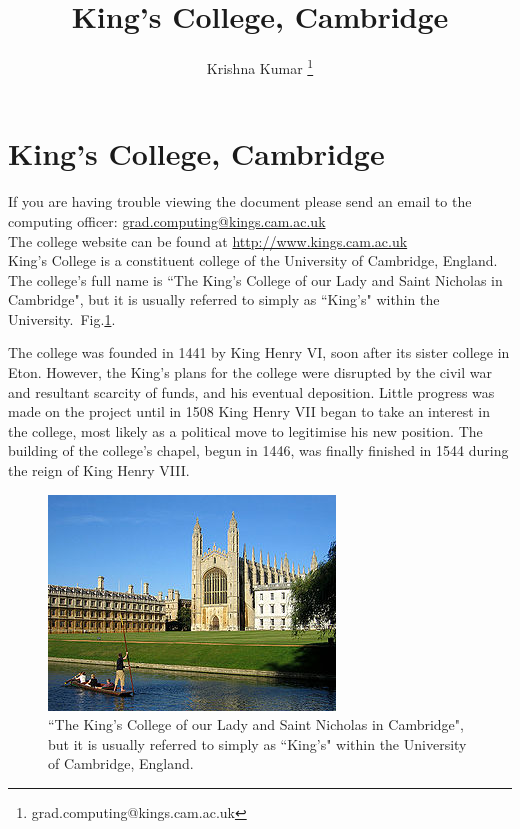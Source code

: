 \documentclass{report}
\title{King's College, Cambridge}
\author{Krishna Kumar \thanks{grad.computing@kings.cam.ac.uk}}
\begin{document}
\maketitle
\listoffigures
\clearpage

\section{King's College, Cambridge}

If you are having trouble viewing the document please send an email to the computing officer: \href{mailto:grad.computing@kings.cam.ac.uk}{grad.computing@kings.cam.ac.uk}\\

The college website can be found at \url{http://www.kings.cam.ac.uk}\\

King's College is a constituent college of the University of Cambridge, England. The college's full name is ``The King's College of our Lady and Saint Nicholas in Cambridge", but it is usually referred to simply as ``King's" within the University.~Fig.\ref{fig:Kings}.

The college was founded in 1441 by King Henry VI, soon after its sister college in Eton. However, the King's plans for the college were disrupted by the civil war and resultant scarcity of funds, and his eventual deposition. Little progress was made on the project until in 1508 King Henry VII began to take an interest in the college, most likely as a political move to legitimise his new position. The building of the college's chapel, begun in 1446, was finally finished in 1544 during the reign of King Henry VIII.

\begin{figure}[htbp!] 
\centering    %
\includegraphics[scale=1.0]{Pictures/Kings.jpg}
\caption[King's College Cambridge]{``The King's College of our Lady and Saint Nicholas in Cambridge", but it is usually referred to simply as ``King's" within the University of Cambridge, England.}
\label{fig:Kings}
\end{figure}
\end{document}
